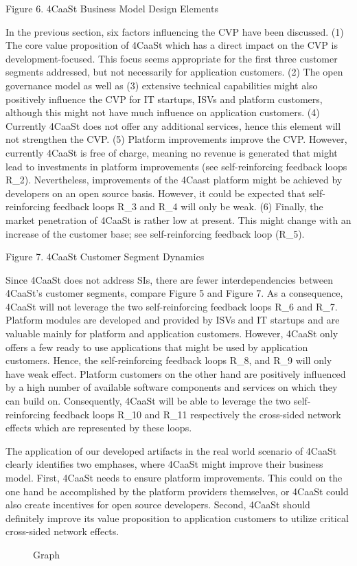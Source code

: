 Figure 6. 4CaaSt Business Model Design Elements

In the previous section, six factors influencing the CVP have been discussed. (1) The core value proposition of 4CaaSt which has a direct impact on the CVP is development-focused. This focus seems appropriate for the first three customer segments addressed, but not necessarily for application customers. (2) The open governance model as well as (3) extensive technical capabilities might also positively influence the CVP for IT startups, ISVs and platform customers, although this might not have much influence on application customers. (4) Currently 4CaaSt does not offer any additional services, hence this element will not strengthen the CVP. (5) Platform improvements improve the CVP. However, currently 4CaaSt is free of charge, meaning no revenue is generated that might lead to investments in platform improvements (see self-reinforcing feedback loops R\_2). Nevertheless, improvements of the 4Caast platform might be achieved by developers on an open source basis. However, it could be expected that self-reinforcing feedback loops R\_3 and R\_4 will only be weak. (6) Finally, the market penetration of 4CaaSt is rather low at present. This might change with an increase of the customer base; see self-reinforcing feedback loop (R\_5).
 
Figure 7. 4CaaSt Customer Segment Dynamics

Since 4CaaSt does not address SIs, there are fewer interdependencies between 4CaaSt's customer segments, compare Figure 5 and Figure 7. As a consequence, 4CaaSt will not leverage the two self-reinforcing feedback loops R\_6 and R\_7. Platform modules are developed and provided by ISVs and IT startups and are valuable mainly for platform and application customers. However, 4CaaSt only offers a few ready to use applications that might be used by application customers. Hence, the self-reinforcing feedback loops R\_8, and R\_9 will only have weak effect. Platform customers on the other hand are positively influenced by a high number of available software components and services on which they can build on. Consequently, 4CaaSt will be able to leverage the two self-reinforcing feedback loops R\_10 and R\_11 respectively the cross-sided network effects which are represented by these loops. 

The application of our developed artifacts in the real world scenario of 4CaaSt clearly identifies two emphases, where 4CaaSt might improve their business model. First, 4CaaSt needs to ensure platform improvements. This could on the one hand be accomplished by the platform providers themselves, or 4CaaSt could also create incentives for open source developers. Second, 4CaaSt should definitely improve its value proposition to application customers to utilize critical cross-sided network effects.

\begin{figure}[t]
	\centering
	
	\caption{Graph}
	\label{fig:gt}
\end{figure}

